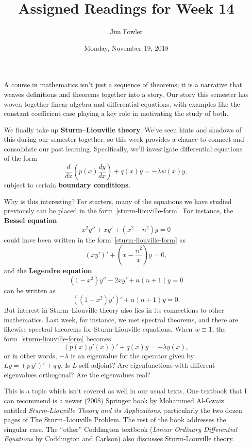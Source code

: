 \documentclass{homework}
\author{Jim Fowler}
\title{Assigned Readings for Week 14}
\date{Monday, November 19, 2018}
\begin{document}
\maketitle

A course in mathematics isn't just a sequence of theorems; it is a
narrative that weaves definitions and theorems together into a story.
Our story this semester has woven together linear algebra and
differential equations, with examples like the constant coefficient
case playing a key role in motivating the study of both.

We finally take up \textbf{Sturm–Liouville
  theory}.  We've seen hints and shadows of this during our semester
together, so this week provides a chance to connect and consolidate
our past learning.  Specifically, we'll investigate differential equations of the form
\begin{equation*}\label{sturm-liouville-form}\tag{$*$}
{ {\frac {d }{d x}}\left( p(x){\frac { {d} y}{ {d} x}}\right)+q(x)y=-\lambda w(x)y,} \end{equation*}
subject to certain \textbf{boundary conditions}.

Why is this interesting?  For starters, many of the equations we have studied previously can be placed in the form~\eqref{sturm-liouville-form}.  For instance, the \textbf{Bessel equation}
\[  x^{2}y''+xy'+\left(x^{2}-n^{2}\right)y=0
\]
could have been written in the form~\eqref{sturm-liouville-form} as
\[
  {\displaystyle \left(xy'\right)'+\left(x-{\frac {n ^{2}}{x}}\right)y=0,}
\]
and the \textbf{Legendre equation}
\[
{\displaystyle \left(1-x^{2}\right)y''-2xy'+n (n +1)y=0}
\]
can be written as
\[
  {\displaystyle \left(\left(1-x^{2}\right)y'\right)'+n (n +1)y=0}.
\]
But interest in Sturm–Liouville theory also lies in its connections to other mathematics.  Last week, for instance, we met spectral theorems, and there are likewise spectral theorems for Sturm-Liouville equations.  When $w \equiv 1$, the form~\eqref{sturm-liouville-form} becomes
\[
  \left( p(x) y'(x) \right)'+q(x)y=-\lambda y(x),
\]
or in other words, $-\lambda$ is an eigenvalue for the operator given by $Ly = \left( p \, y' \right)'+q \, y$.  Is $L$ self-adjoint?  Are eigenfunctions with different eigenvalues orthogonal?  Are the eigenvalues real?  

This is a topic which isn't covered as well in our usual texts.  One
textbook that I can recommend is a newer (2008) Springer book by
Mohammed Al-Gwaiz entitled \textit{Sturm-Liouville Theory and its
  Applications}, particularly the two dozen pages of 
The Sturm–Liouville Problem.  The rest of the book addresses the
singular case.  The ``other'' Coddington textbook (\textit{Linear
  Ordinary Differential Equations} by Coddington and Carlson) also
discusses Sturm-Liouville theory.

\end{document}
